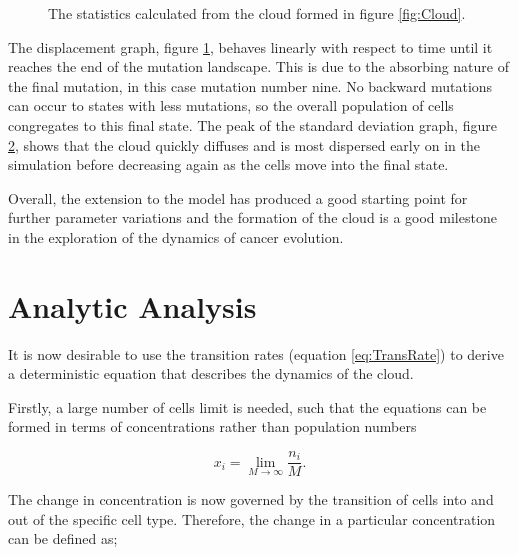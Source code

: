 \documentclass[12pt, a4paper,]{article}
\begin{document}
\begin{figure}[H]
	\begin{subfigure}[h]{0.5 \textwidth}
		\caption{}
		\label{fig:FlatDisp}
	\end{subfigure}%
	\begin{subfigure}[h]{ 0.5 \textwidth}	
		\caption{}
		\label{fig:FlatVar}
	\end{subfigure}
	\caption{The statistics calculated from the cloud formed in figure \ref{fig:Cloud}.}	
	\label{fig:FlatStats}
\end{figure}

The displacement graph, figure \ref{fig:FlatDisp}, behaves linearly with respect to time until it reaches the end of the mutation landscape. This is due to the absorbing nature of the final mutation, in this case mutation number nine. No backward mutations can occur to states with less mutations, so the overall population of cells congregates to this final state. The peak of the standard deviation graph, figure \ref{fig:FlatVar}, shows that the cloud quickly diffuses and is most dispersed early on in the simulation before decreasing again as the cells move into the final state.

Overall, the extension to the model has produced a good starting point for further parameter variations and the formation of the cloud is a good milestone in the exploration of the dynamics of cancer evolution.

\section{Analytic Analysis}

It is now desirable to use the transition rates (equation  \eqref{eq:TransRate}) to derive a deterministic equation that describes the dynamics of the cloud. 

Firstly, a large number of cells limit is needed, such that the equations can be formed in terms of concentrations rather than population numbers

\begin{equation}
x _ i = \lim _{M \rightarrow \infty} \frac{n_i}{M}.
\label{eq:LargeCellAsumption}
\end{equation}

The change in concentration is now governed by the transition of cells into and out of the specific cell type. Therefore, the change in a particular concentration can be defined as; 
\end{document}
